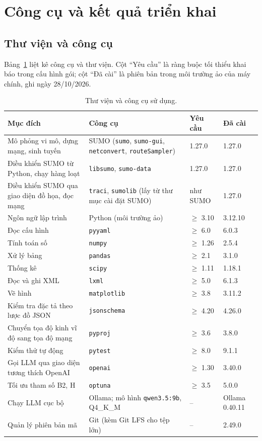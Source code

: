 \documentclass[../main.tex]{subfiles}
\begin{document}
\section{Công cụ và kết quả triển khai}
\label{section:tools}

\subsection{Thư viện và công cụ}

Bảng~\ref{table:4.3} liệt kê công cụ và thư viện. Cột ``Yêu cầu'' là ràng buộc tối thiểu khai báo trong cấu hình gói; cột ``Đã cài'' là phiên bản trong môi trường ảo của máy chính, ghi ngày 28/10/2026.

\begin{table}[H]
\centering
\small
\caption{Thư viện và công cụ sử dụng.} \label{table:4.3}
\begin{tabular}{|p{4.6cm}|p{4.4cm}|p{2.0cm}|p{2.0cm}|}
\hline
\textbf{Mục đích} & \textbf{Công cụ} & \textbf{Yêu cầu} & \textbf{Đã cài} \\ \hline
Mô phỏng vi mô, dựng mạng, sinh tuyến & SUMO (\texttt{sumo}, \texttt{sumo-gui}, \texttt{netconvert}, \texttt{routeSampler})~\cite{lopez2018sumo} & 1.27.0 & 1.27.0 \\ \hline
Điều khiển SUMO từ Python, chạy hàng loạt & \texttt{libsumo}, \texttt{sumo-data} & 1.27.0 & 1.27.0 \\ \hline
Điều khiển SUMO qua giao diện đồ họa, đọc mạng & \texttt{traci}, \texttt{sumolib} (lấy từ thư mục cài đặt SUMO) & như SUMO & 1.27.0 \\ \hline
Ngôn ngữ lập trình & Python (môi trường ảo) & $\geq$ 3.10 & 3.12.10 \\ \hline
Đọc cấu hình & \texttt{pyyaml} & $\geq$ 6.0 & 6.0.3 \\ \hline
Tính toán số & \texttt{numpy} & $\geq$ 1.26 & 2.5.4 \\ \hline
Xử lý bảng & \texttt{pandas} & $\geq$ 2.1 & 3.1.0 \\ \hline
Thống kê & \texttt{scipy} & $\geq$ 1.11 & 1.18.1 \\ \hline
Đọc và ghi XML & \texttt{lxml} & $\geq$ 5.0 & 6.1.3 \\ \hline
Vẽ hình & \texttt{matplotlib} & $\geq$ 3.8 & 3.11.2 \\ \hline
Kiểm tra đặc tả theo lược đồ JSON & \texttt{jsonschema} & $\geq$ 4.20 & 4.26.0 \\ \hline
Chuyển tọa độ kinh vĩ độ sang tọa độ mạng & \texttt{pyproj} & $\geq$ 3.6 & 3.8.0 \\ \hline
Kiểm thử tự động & \texttt{pytest} & $\geq$ 8.0 & 9.1.1 \\ \hline
Gọi LLM qua giao diện tương thích OpenAI & \texttt{openai} & $\geq$ 1.30 & 3.40.0 \\ \hline
Tối ưu tham số B2, H~\cite{akiba2019optuna} & \texttt{optuna} & $\geq$ 3.5 & 5.0.0 \\ \hline
Chạy LLM cục bộ & Ollama; mô hình \texttt{qwen3.5:9b}, Q4\_K\_M & -- & Ollama 0.40.11 \\ \hline
Quản lý phiên bản mã & Git (kèm Git LFS cho tệp lớn) & -- & 2.49.0 \\ \hline
\end{tabular}
\end{table}
\end{document}
